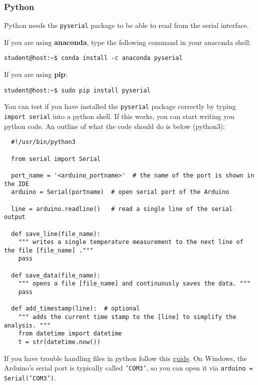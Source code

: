 \subsubsection{Python}
Python needs the \texttt{pyserial} package to be able to read from the serial interface.\par
%
\noindent If you are using \textbf{anaconda}, type the following command in your anaconda shell:
%
\begin{verbatim}
student@host:~$ conda install -c anaconda pyserial
\end{verbatim}
%
\noindent If you are using \textbf{pip}:
\begin{verbatim}
student@host:~$ sudo pip install pyserial
\end{verbatim}
%
You can test if you have installed the \texttt{pyserial} package correctly by typing \texttt{import serial} into a python shell. If this works, you can start writing you python code. An outline of what the code should do is below (python3):
%
\mdfsetblack
\begin{verbatim}
  #!/usr/bin/python3
  
  from serial import Serial
  
  port_name = '<arduino_portname>'  # the name of the port is shown in the IDE
  arduino = Serial(portname)  # open serial port of the Arduino
  
  line = arduino.readline()   # read a single line of the serial output
  
  def save_line(file_name):  
    """ writes a single temperature measurement to the next line of the file [file_name] ."""
    pass
    
  def save_data(file_name):
    """ opens a file [file_name] and continuously saves the data. """
    pass
    
  def add_timestamp(line):  # optional
    """ adds the current time stamp to the [line] to simplify the analysis. """
    from datetime import datetime
    t = str(datetime.now())
\end{verbatim}
%
If you have trouble handling files in python follow this \href{http://www.pythonforbeginners.com/files/reading-and-writing-files-in-python}{guide}. On Windows, the Arduino's serial port is typically called \texttt{'COM3'}, so you can open it via \texttt{arduino = Serial('COM3')}.
%
